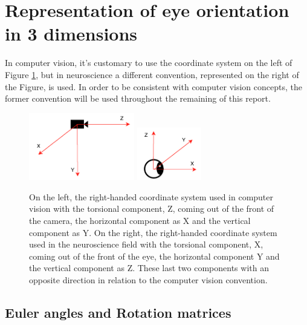 \section{Representation of eye orientation in 3 dimensions}
\label{cha2:represent}
In computer vision, it's customary to use the coordinate system on the left of Figure \ref{cha2:sec2:fig:coordsys2}, but in neuroscience a different convention, represented on the right of the Figure, is used. In order to be consistent with computer vision concepts, the former convention will be used throughout the remaining of this report.

\begin{figure}[!htb]
	\centering
	\includegraphics[width=0.41\textwidth]{images/cvcoordinatesys.pdf}
	\includegraphics[width=0.25\textwidth]{images/cvcoordinatesysq.pdf}
	\caption[Computer Vision vs Neuroscience coordinate systems]{On the left, the right-handed coordinate system used in computer vision with the torsional component, Z, coming out of the front of the camera, the horizontal component as X and the vertical component as Y. On the right, the right-handed coordinate system used in the neuroscience field with the torsional component, X, coming out of the front of the eye, the horizontal component Y and the vertical component as Z. These last two components with an opposite direction in relation to the computer vision convention.}
	\label{cha2:sec2:fig:coordsys2}
\end{figure}

\subsection{Euler angles and Rotation matrices}
\label{rotmatsss}

